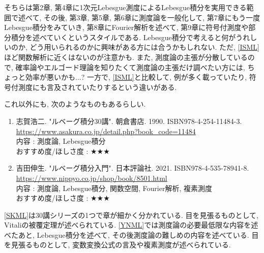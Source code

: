 \documentclass[10pt,a4paper]{jsarticle}
\begin{document}
    そちらは第2章, 第4章に1次元Lebesgue測度によるLebesgue積分を実用できる範囲で述べて, その後, 第3章, 第5章, 第6章に測度論を一般化して, 第7章にもう一度Lebesgue積分をみていき, 第8章にFourier解析を述べて, 第9章に符号付測度や部分積分を述べていくというスタイルである. Lebesgue積分で考えると何がうれしいのか, どう用いられるのかに興味がある方には合うかもしれない. ただ, \ref{ISML}ほど関数解析に近くはないのが注意かも. また, 測度論の主張が分散しているので, 確率論やエルゴード理論を知りたくて測度論の主張だけ調べたい方には, ちょっと効率が悪いかも...? 一方で, \ref{ISML}と比較して, 例が多く載っていたり, 符号付測度にも言及されていたりするという違いがある. \par
    これ以外にも, 次のようなものもあるらしい. 
    \begin{enumerate}
        \renewcommand{\theenumi}{[ML\arabic{enumi}]}
        \renewcommand{\labelenumi}{\theenumi}
        \setcounter{enumi}{2}
        \item \label{SKML} 志賀浩二. "ルベーグ積分30講". 朝倉書店. 1990. ISBN978-4-254-11484-3. \\
        \url{https://www.asakura.co.jp/detail.php?book_code=11484} \\
        内容 : 測度論, Lebesgue積分\\
        おすすめ度/ほしさ度 : $\bigstar \bigstar \bigstar $
        \item \label{YNML} 吉田伸生. "ルベーグ積分入門". 日本評論社. 2021. ISBN978-4-535-78941-8. \\
        \url{https://www.nippyo.co.jp/shop/book/8501.html} \\
        内容 : 測度論, Lebesgue積分, 関数空間, Fourier解析, 複素測度\\
        おすすめ度/ほしさ度 : $\bigstar \bigstar \bigstar $
    \end{enumerate}\par 
    \ref{SKML}は30講シリーズの1つで章が細かく分かれている. 目を見張るものとして, Vitaliの被覆定理が述べられている. \ref{YNML}では測度論の必要最低限な内容を述べたあと, Lebesgue積分を述べて, その後測度論の難しめの内容を述べている. 目を見張るものとして, 変数変換公式の言及や複素測度が述べられている. 
\end{document}

